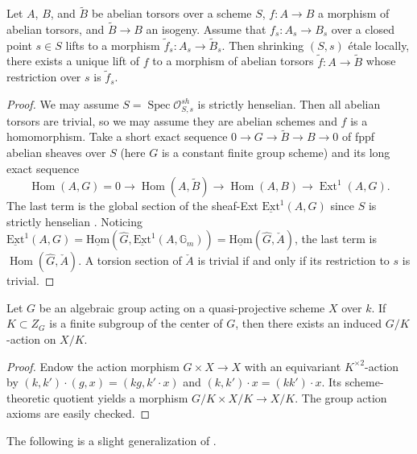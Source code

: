 \documentclass[reqno, letterpaper]{amsart}
\numberwithin{equation}{subsection}
\let\to\longrightarrow
\newcommand{\GG}{\mathbb{G}}
\DeclareMathOperator{\Hom}{Hom}
\DeclareMathOperator{\Ext}{Ext}
\DeclareMathOperator{\Spec}{Spec}
\newcommand{\SheafHom}{\underline{\mathrm{Hom}}}
\newcommand{\SheafExt}{\underline{\mathrm{Ext}}}
\begin{document}
		\begin{lemma} \label{lem:lifting morphism of abelian torsors}
			Let $A$, $B$, and $\tilde B$ be abelian torsors over a scheme $S$, $f : A \to B$ a morphism of abelian torsors, and $\tilde B \to B$ an isogeny. Assume that $f_s : A_s \to B_s$ over a closed point $s \in S$ lifts to a morphism $\tilde f_s : A_s \to \tilde B_s$. Then shrinking $(S, s)$ \'etale locally, there exists a unique lift of $f$ to a morphism of abelian torsors $\tilde f : A \to \tilde B$ whose restriction over $s$ is $\tilde f_s$.
		\end{lemma}
		\begin{proof}
			We may assume $S = \Spec \mathcal O_{S, s}^{sh}$ is strictly henselian. Then all abelian torsors are trivial, so we may assume they are abelian schemes and $f$ is a homomorphism. Take a short exact sequence $0 \to G \to \tilde B \to B \to 0$ of fppf abelian sheaves over $S$ (here $G$ is a constant finite group scheme) and its long exact sequence
			\[ \Hom (A, G) = 0 \to \Hom (A, \tilde B) \to \Hom (A, B) \to \Ext^1 (A, G) .\]
			The last term is the global section of the sheaf-Ext $\SheafExt^1 (A, G)$ since $S$ is strictly henselian \cite[Tag~03QO]{stacks-project}. Noticing $\SheafExt^1 (A, G) = \SheafHom (\hat G, \SheafExt^1 (A, \GG_m)) = \SheafHom (\hat G, \check A)$, the last term is $\Hom (\hat G, \check A)$. A torsion section of $\check A$ is trivial if and only if its restriction to $s$ is trivial.
		\end{proof}
		
		\begin{lemma} \label{lem:quotient action}
			Let $G$ be an algebraic group acting on a quasi-projective scheme $X$ over $k$. If $K \subset Z_G$ is a finite subgroup of the center of $G$, then there exists an induced $G/K$-action on $X/K$.
		\end{lemma}
		\begin{proof}
			Endow the action morphism $G \times X \to X$ with an equivariant $K^{\times 2}$-action by $(k,k') \cdot (g,x) = (kg, k' \cdot x)$ and $(k,k') \cdot x = (kk') \cdot x$. Its scheme-theoretic quotient yields a morphism $G/K \times X/K \to X/K$. The group action axioms are easily checked.
		\end{proof}
		
		The following is a slight generalization of \cite[Lemma~5.16]{ari-fed16}.
		
\end{document}
